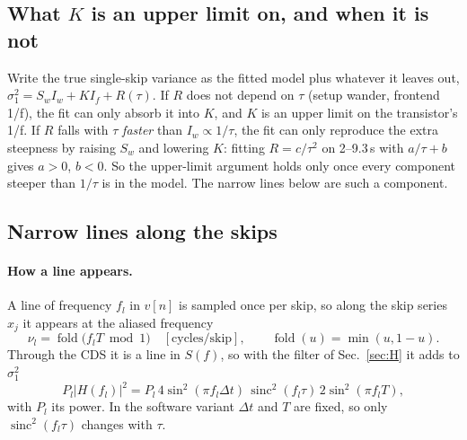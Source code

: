 \documentclass[10pt,a4paper]{article}
\newcommand{\sinc}{\operatorname{sinc}}
\begin{document}
\subsection{What $K$ is an upper limit on, and when it is not}
Write the true single-skip variance as the fitted model plus whatever it leaves out, $\sigma_1^2=S_wI_w+KI_f+R(\tau)$.
If $R$ does not depend on $\tau$ (setup wander, frontend 1/f), the fit can only absorb it into $K$, and $K$ is an
upper limit on the transistor's 1/f. If $R$ falls with $\tau$ \emph{faster} than $I_w\propto1/\tau$, the fit can only
reproduce the extra steepness by raising $S_w$ and lowering $K$: fitting $R=c/\tau^2$ on 2--9.3\,\textmu s with
$a/\tau+b$ gives $a>0$, $b<0$. So the upper-limit argument holds only once every component steeper than $1/\tau$ is in
the model. The narrow lines below are such a component.

\subsection{Narrow lines along the skips}\label{sec:lines}
\paragraph{How a line appears.} A line of frequency $f_l$ in $v[n]$ is sampled once per skip, so along the skip series
$x_j$ it appears at the aliased frequency
\begin{equation}
\nu_l=\operatorname{fold}\!\big(f_lT\bmod1\big)\quad[\text{cycles/skip}],\qquad \operatorname{fold}(u)=\min(u,1-u).
\end{equation}
Through the CDS it is a line in $S(f)$, so with the filter of Sec.~\ref{sec:H} it adds to $\sigma_1^2$
\begin{equation}
P_l|H(f_l)|^2=P_l\,4\sin^2(\pi f_l\Delta t)\,\sinc^2(f_l\tau)\,2\sin^2(\pi f_lT),
\end{equation}
with $P_l$ its power. In the software variant $\Delta t$ and $T$ are fixed, so only $\sinc^2(f_l\tau)$ changes with $\tau$.
\end{document}
